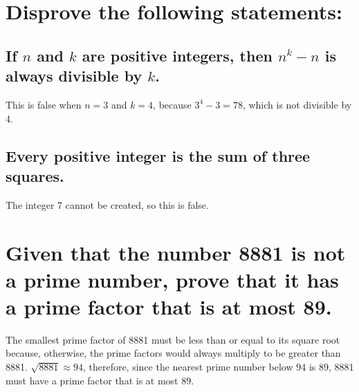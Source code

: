\documentclass[12pt]{article}
\begin{document}
\section{Disprove the following statements:}
\subsection{If $n$ and $k$ are positive integers, then $n^k - n$ is always divisible by $k$.}
This is false when $n=3$ and $k=4$, because $3^4-3 = 78$, which is not divisible by 4.
\subsection{Every positive integer is the sum of three squares.}
The integer 7 cannot be created, so this is false.

\section{
    Given that the number 8881 is not a prime number, prove that it has a prime factor that is at most 89.
}
The smallest prime factor of 8881 must be less than or equal to its square root 
because, otherwise, the prime factors would always multiply to be greater than 8881.
$\sqrt{8881} \approx 94$, therefore, since the nearest prime number below 94 is 89, 
8881 must have a prime factor that is at most 89.
\end{document}
